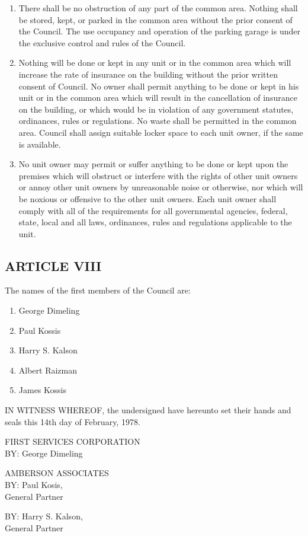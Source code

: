 \documentclass[]{tufte-handout}
\providecommand{\tightlist}{%
  \setlength{\itemsep}{0pt}\setlength{\parskip}{0pt}}
\begin{document}
\begin{enumerate}
\def\labelenumi{(\Alph{enumi})}
\item
  There shall be no obstruction of any part of the common area. Nothing
  shall be stored, kept, or parked in the common area without the prior
  consent of the Council. The use occupancy and operation of the parking
  garage is under the exclusive control and rules of the Council.
\item
  Nothing will be done or kept in any unit or in the common area which
  will increase the rate of insurance on the building without the prior
  written consent of Council. No owner shall permit anything to be done
  or kept in his unit or in the common area which will result in the
  cancellation of insurance on the building, or which would be in
  violation of any government statutes, ordinances, rules or
  regulations. No waste shall be permitted in the common area. Council
  shall assign suitable locker space to each unit owner, if the same is
  available.
\item
  No unit owner may permit or suffer anything to be done or kept upon
  the premises which will obstruct or interfere with the rights of other
  unit owners or annoy other unit owners by unreasonable noise or
  otherwise, nor which will be noxious or offensive to the other unit
  owners. Each unit owner shall comply with all of the requirements for
  all governmental agencies, federal, state, local and all laws,
  ordinances, rules and regulations applicable to the unit.
\end{enumerate}

\hypertarget{article-viii}{%
\subsection*{ARTICLE VIII}\label{article-viii}}

The names of the first members of the Council are:

\begin{enumerate}
\def\labelenumi{\arabic{enumi}.}
\tightlist
\item
  George Dimeling
\item
  Paul Kossis
\item
  Harry S. Kalson
\item
  Albert Raizman
\item
  James Kossis
\end{enumerate}

IN WITNESS WHEREOF, the undersigned have hereunto set their hands and
seals this 14th day of February, 1978.

FIRST SERVICES CORPORATION\\
BY: George Dimeling

AMBERSON ASSOCIATES\\
BY: Paul Kosis,\\
General Partner

BY: Harry S. Kalson,\\
General Partner


\end{document}
